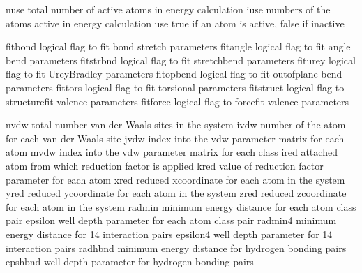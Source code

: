 \documentclass[letterpaper,11pt,english]{sphinxmanual}
\begin{document}
\sphinxAtStartPar
{}

\begin{sphinxVerbatim}[commandchars=\\\{\}]
nuse            total number of active atoms in energy calculation
iuse            numbers of the atoms active in energy calculation
use             true if an atom is active, false if inactive
\end{sphinxVerbatim}

\sphinxAtStartPar
{}

\begin{sphinxVerbatim}[commandchars=\\\{\}]
fit\PYGZus{}bond        logical flag to fit bond stretch parameters
fit\PYGZus{}angle       logical flag to fit angle bend parameters
fit\PYGZus{}strbnd      logical flag to fit stretch\PYGZhy{}bend parameters
fit\PYGZus{}urey        logical flag to fit Urey\PYGZhy{}Bradley parameters
fit\PYGZus{}opbend      logical flag to fit out\PYGZhy{}of\PYGZhy{}plane bend parameters
fit\PYGZus{}tors        logical flag to fit torsional parameters
fit\PYGZus{}struct      logical flag to structure\PYGZhy{}fit valence parameters
fit\PYGZus{}force       logical flag to force\PYGZhy{}fit valence parameters
\end{sphinxVerbatim}

\sphinxAtStartPar
{}

\begin{sphinxVerbatim}[commandchars=\\\{\}]
nvdw            total number van der Waals sites in the system
ivdw            number of the atom for each van der Waals site
jvdw            index into the vdw parameter matrix for each atom
mvdw            index into the vdw parameter matrix for each class
ired            attached atom from which reduction factor is applied
kred            value of reduction factor parameter for each atom
xred            reduced x\PYGZhy{}coordinate for each atom in the system
yred            reduced y\PYGZhy{}coordinate for each atom in the system
zred            reduced z\PYGZhy{}coordinate for each atom in the system
radmin          minimum energy distance for each atom class pair
epsilon         well depth parameter for each atom class pair
radmin4         minimum energy distance for 1\PYGZhy{}4 interaction pairs
epsilon4        well depth parameter for 1\PYGZhy{}4 interaction pairs
radhbnd         minimum energy distance for hydrogen bonding pairs
epshbnd         well depth parameter for hydrogen bonding pairs
\end{sphinxVerbatim}
\end{document}
